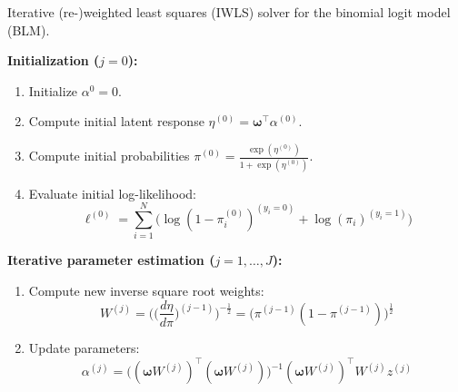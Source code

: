 \documentclass[article,nojss,shortnames]{jss}
\begin{document}
\begin{algorithm}
    \caption{Iterative (re-)weighted least squares (IWLS) solver for the binomial logit model (BLM).}
    \label{alg:iwls}

    \textbf{Initialization ($j = 0$):}
    \begin{enumerate}
        \item Initialize $\mathit{\alpha}^{0} = 0$.
        \item Compute initial latent response $\mathit{\eta}^{(0)} = \mathbf{\omega}^\top\mathit{\alpha}^{(0)}$.
        \item Compute initial probabilities $\pi^{(0)} = \frac{\exp(\eta^{(0)})}{1 + \exp(\eta^{(0)})}$. 
        \item Evaluate initial log-likelihood:
            \begin{equation*}
                \ell^{(0)} = %
                \sum_{i=1}^{N} \Big(\log(1 - \pi_i^{(0)})^{(y_i = 0)} + \log(\pi_i)^{(y_i=1)}\Big)
            \end{equation*}

    \end{enumerate}
    \textbf{Iterative parameter estimation ($j = 1, \dots, J$):}
    \begin{enumerate}
        \item Compute new inverse square root weights:
            \begin{equation*}
                \mathit{W}^{(j)} = \Big(\big(\frac{d\eta}{d\pi}\big)^{(j-1)}\Big)^{-\frac{1}{2}} =
                    \big(\mathit{\pi}^{(j-1)} (1 - \mathit{\pi}^{(j-1)})\big)^\frac{1}{2}
            \end{equation*}
        \item Update parameters:
            \begin{equation*}
                \mathit{\alpha}^{(j)} =
                    \big((\mathbf{\omega} \mathit{W}^{(j)})^\top
                    (\mathbf{\omega} \mathit{W}^{(j)})\big)^{-1}
                    (\mathbf{\omega} \mathit{W}^{(j)})^\top
                    \mathit{W}^{(j)} \mathit{z}^{(j)}
            \end{equation*}


\end{enumerate}
\end{algorithm}
\end{document}
